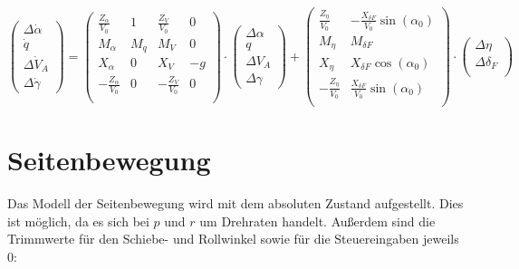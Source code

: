 \begin{equation}\label{eq:laengsbewegung}
	\begin{pmatrix}
		\Delta \dot \alpha\\
		\dot q\\
		\Delta \dot V_A\\
		\Delta \dot \gamma
	\end{pmatrix} = 
	\begin{pmatrix}
		\frac{Z_\alpha}{V_0} & 1 & \frac{Z_V}{V_0} & 0\\
		M_\alpha & M_q & M_V & 0\\
		X_\alpha & 0 & X_V & -g\\
		-\frac{Z_\alpha}{V_0} & 0 & -\frac{Z_V}{V_0} & 0\\
	\end{pmatrix} \cdot
	\begin{pmatrix}
		\Delta \alpha\\
		q\\
		\Delta V_A\\
		\Delta \gamma
	\end{pmatrix} + 
	\begin{pmatrix}
		\frac{Z_\eta}{V_0} & -\frac{X_{\delta F}}{V_0} \sin{(\alpha_0)}\\
		M_\eta & M_{\delta F}\\
		X_\eta & X_{\delta F} \cos{(\alpha_0)}\\
		-\frac{Z_\eta}{V_0} & \frac{X_{\delta F}}{V_0} \sin{(\alpha_0)}\\
	\end{pmatrix}\cdot
	\begin{pmatrix}
		\Delta \eta\\
		\Delta \delta_F\\
	\end{pmatrix}
\end{equation}

\section{Seitenbewegung}
Das Modell der Seitenbewegung wird mit dem absoluten Zustand aufgestellt. Dies ist möglich, da es sich bei $ p $ und $ r $ 
um Drehraten handelt. Außerdem sind die Trimmwerte für den Schiebe- und Rollwinkel sowie für die Steuereingaben jeweils $ 0 
$:

